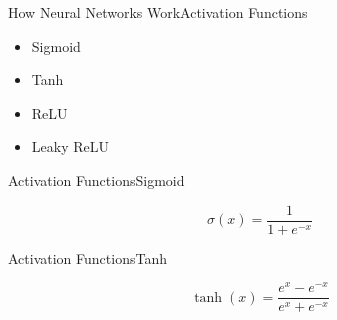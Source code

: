 \documentclass{beamer}
\begin{document}
\begin{frame}{How Neural Networks Work}{Activation Functions}
    \begin{itemize}
        \item Sigmoid
        \item Tanh
        \item ReLU
        \item Leaky ReLU
    \end{itemize}
\end{frame}

\begin{frame}{Activation Functions}{Sigmoid}
    \begin{multicols}{2}
        \begin{equation}
            \sigma(x)=\frac{1}{1+e^{-x}}
        \end{equation}
        \begin{center}
        \end{center}
    \end{multicols}
\end{frame}

\begin{frame}{Activation Functions}{Tanh}
    \begin{multicols}{2}
        \begin{equation}
            \tanh(x)=\frac{e^x-e^{-x}}{e^x+e^{-x}}
        \end{equation}
        \begin{center}
        \end{center}
    \end{multicols}
\end{frame}
\end{document}
